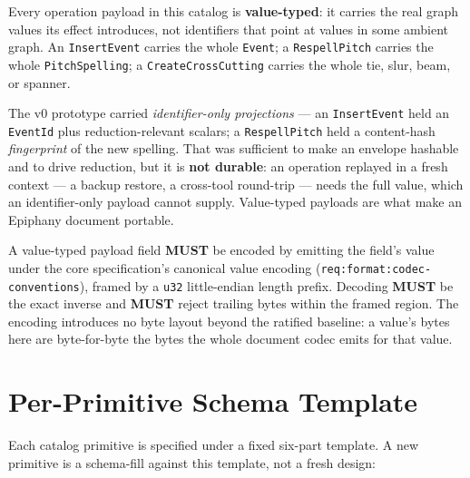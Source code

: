 \documentclass[11pt,letterpaper]{report}
\newcounter{requirement}[chapter]
\newcommand{\MUST}{\textbf{MUST}}
\begin{document}
Every operation payload in this catalog is \textbf{value-typed}: it carries the
real graph values its effect introduces, not identifiers that point at values in
some ambient graph. An \texttt{InsertEvent} carries the whole \texttt{Event}; a
\texttt{RespellPitch} carries the whole \texttt{PitchSpelling}; a
\texttt{CreateCrossCutting} carries the whole tie, slur, beam, or spanner.

\begin{rationale}
The v0 prototype carried \emph{identifier-only projections} --- an
\texttt{InsertEvent} held an \texttt{EventId} plus reduction-relevant scalars; a
\texttt{RespellPitch} held a content-hash \emph{fingerprint} of the new spelling.
That was sufficient to make an envelope hashable and to drive reduction, but it
is \textbf{not durable}: an operation replayed in a fresh context --- a backup
restore, a cross-tool round-trip --- needs the full value, which an
identifier-only payload cannot supply. Value-typed payloads are what make an
Epiphany document portable.
\end{rationale}

\begin{requirement}
\label{req:catalog:value-encoding}
A value-typed payload field \MUST{} be encoded by emitting the field's value
under the core specification's canonical value encoding
(\texttt{req:format:codec-conventions}), framed by a \texttt{u32} little-endian
length prefix. Decoding \MUST{} be the exact inverse and \MUST{} reject trailing
bytes within the framed region. The encoding introduces no byte layout beyond the
ratified baseline: a value's bytes here are byte-for-byte the bytes the whole
document codec emits for that value.
\end{requirement}

\section{Per-Primitive Schema Template}
\label{sec:framework:template}

Each catalog primitive is specified under a fixed six-part template. A new
primitive is a schema-fill against this template, not a fresh design:
\end{document}
